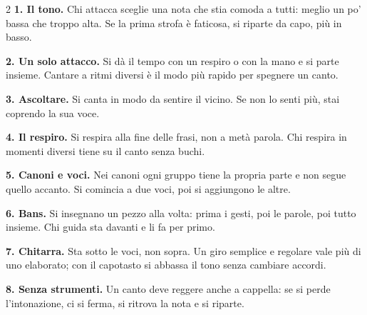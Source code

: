 \begingroup\small
\begin{multicols}{2}
\textbf{1. Il tono.} Chi attacca sceglie una nota che stia comoda a tutti: meglio un po' bassa che
troppo alta. Se la prima strofa è faticosa, si riparte da capo, più in basso.

\smallskip
\textbf{2. Un solo attacco.} Si dà il tempo con un respiro o con la mano e si parte insieme.
Cantare a ritmi diversi è il modo più rapido per spegnere un canto.

\smallskip
\textbf{3. Ascoltare.} Si canta in modo da sentire il vicino. Se non lo senti più, stai coprendo
la sua voce.

\smallskip
\textbf{4. Il respiro.} Si respira alla fine delle frasi, non a metà parola. Chi respira in
momenti diversi tiene su il canto senza buchi.

\columnbreak
\textbf{5. Canoni e voci.} Nei canoni ogni gruppo tiene la propria parte e non segue quello
accanto. Si comincia a due voci, poi si aggiungono le altre.

\smallskip
\textbf{6. Bans.} Si insegnano un pezzo alla volta: prima i gesti, poi le parole, poi tutto
insieme. Chi guida sta davanti e li fa per primo.

\smallskip
\textbf{7. Chitarra.} Sta sotto le voci, non sopra. Un giro semplice e regolare vale più di uno
elaborato; con il capotasto si abbassa il tono senza cambiare accordi.

\smallskip
\textbf{8. Senza strumenti.} Un canto deve reggere anche a cappella: se si perde l'intonazione,
ci si ferma, si ritrova la nota e si riparte.
\end{multicols}
\endgroup
